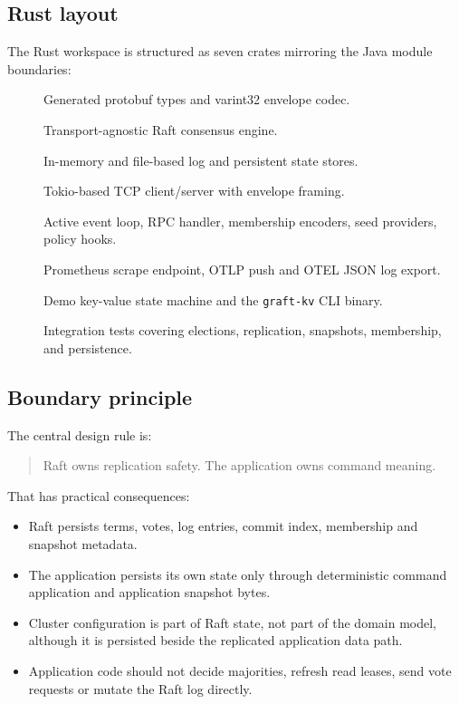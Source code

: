 \subsection{Rust layout}

The Rust workspace is structured as seven crates mirroring the Java module boundaries:

\begin{description}
\item[] Generated protobuf types and varint32 envelope codec.
\item[] Transport-agnostic Raft consensus engine.
\item[] In-memory and file-based log and persistent state stores.
\item[] Tokio-based TCP client/server with envelope framing.
\item[] Active event loop, RPC handler, membership encoders, seed providers, policy hooks.
\item[] Prometheus scrape endpoint, OTLP push and OTEL JSON log export.
\item[] Demo key-value state machine and the \texttt{graft-kv} CLI binary.
\item[] Integration tests covering elections, replication, snapshots, membership, and persistence.
\end{description}

\subsection{Boundary principle}

The central design rule is:

\begin{quote}
Raft owns replication safety. The application owns command meaning.
\end{quote}

That has practical consequences:

\begin{itemize}
\item Raft persists terms, votes, log entries, commit index, membership and snapshot metadata.
\item The application persists its own state only through deterministic command application and application snapshot bytes.
\item Cluster configuration is part of Raft state, not part of the domain model, although it is persisted beside the replicated application data path.
\item Application code should not decide majorities, refresh read leases, send vote requests or mutate the Raft log directly.
\end{itemize}

